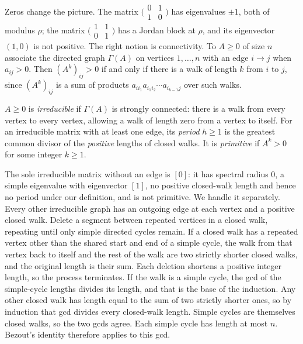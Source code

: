 Zeros change the picture. The matrix $\bigl(\begin{smallmatrix}0&1\\1&0\end{smallmatrix}\bigr)$ has eigenvalues $\pm1$, both
of modulus $\rho$; the matrix $\bigl(\begin{smallmatrix}1&1\\0&1\end{smallmatrix}\bigr)$ has a Jordan block at $\rho$, and its
eigenvector $(1,0)$ is not positive. The right notion is connectivity. To $A\ge0$ of size $n$ associate the directed graph
$\Gamma(A)$ on vertices $1,\dots,n$ with an edge $i\to j$ when $a_{ij}>0$. Then $(A^k)_{ij}>0$ if and only if there is a walk of
length $k$ from $i$ to $j$, since $(A^k)_{ij}$ is a sum of products $a_{ii_1}a_{i_1i_2}\cdots a_{i_{k-1}j}$ over such walks.

\begin{definition}\label{linear:def:irreducible}
$A\ge0$ is \emph{irreducible} if $\Gamma(A)$ is strongly connected: there is a walk from every vertex to every vertex,
allowing a walk of length zero from a vertex to itself. For an irreducible
matrix with at least one edge, its \emph{period} $h\ge1$ is the greatest common
divisor of the \emph{positive} lengths of closed walks. It is \emph{primitive}
if $A^k>0$ for some integer $k\ge1$.
\end{definition}

The sole irreducible matrix without an edge is $[0]$: it has spectral radius
$0$, a simple eigenvalue with eigenvector $[1]$, no positive closed-walk length
and hence no period under our definition, and is not primitive. We handle it
separately. Every other irreducible graph has an outgoing edge at each vertex
and a positive closed walk. Delete a segment between repeated vertices in a
closed walk, repeating until only simple directed cycles remain. If a closed walk has a repeated vertex other than the shared start and end of a simple cycle, the walk from that vertex back to itself and the rest of the walk are two strictly shorter closed walks, and the original length is their sum. Each deletion shortens a positive integer length, so the process terminates. If the walk is a simple cycle, the gcd of the simple-cycle lengths divides its length, and that is the base of the induction. Any other closed walk has length equal to the sum of two strictly shorter ones, so by induction that gcd divides every closed-walk length. Simple cycles are themselves closed walks, so the two gcds agree. Each simple cycle has length at most $n$. Bezout's identity therefore applies to this gcd.

